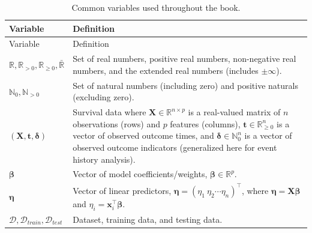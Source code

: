 \documentclass[
  letterpaper,
  krantz2]{style/krantz}
\begin{document}
\begin{longtable}[]{@{}
  >{\raggedright\arraybackslash}p{}
  >{\raggedright\arraybackslash}p{}@{}}
\caption{Common variables used throughout the
book.}\label{tbl-not-var}\tabularnewline
\toprule\noalign{}
\begin{minipage}[b]{\linewidth}\raggedright
Variable
\end{minipage} & \begin{minipage}[b]{\linewidth}\raggedright
Definition
\end{minipage} \\
\midrule\noalign{}
\endfirsthead
\toprule\noalign{}
\begin{minipage}[b]{\linewidth}\raggedright
Variable
\end{minipage} & \begin{minipage}[b]{\linewidth}\raggedright
Definition
\end{minipage} \\
\midrule\noalign{}
\endhead
\bottomrule\noalign{}
\endlastfoot
\(\mathbb{R}, \mathbb{R}_{>0}, \mathbb{R}_{\geq 0}, \bar{\mathbb{R}}\) &
Set of real numbers, positive real numbers, non-negative real numbers,
and the extended real numbers (includes \(\pm\infty\)). \\
\(\mathbb{N}_0, \mathbb{N}_{> 0}\) & Set of natural numbers (including
zero) and positive naturals (excluding zero). \\
\((\mathbf{X}, \mathbf{t}, \boldsymbol{\delta})\) & Survival data where
\(\mathbf{X}\in \mathbb{R}^{n \times p}\) is a real-valued matrix of
\(n\) observations (rows) and \(p\) features (columns),
\(\mathbf{t}\in \mathbb{R}_{\geq 0}^n\) is a vector of observed outcome
times, and \(\boldsymbol{\delta}\in \mathbb{N}_0^n\) is a vector of
observed outcome indicators (generalized here for event history
analysis). \\
\(\boldsymbol{\beta}\) & Vector of model coefficients/weights,
\(\boldsymbol{\beta}\in \mathbb{R}^p\). \\
\(\boldsymbol{\eta}\) & Vector of linear predictors,
\(\boldsymbol{\mathbf{\eta}} = ({\eta}_1 \ {\eta}_2 \cdots {\eta}_{n})^\top\),
where \(\boldsymbol{\eta}= \mathbf{X}\boldsymbol{\beta}\) and
\(\eta_i = \mathbf{x}_{i}^\top\boldsymbol{\beta}\). \\
\(\mathcal{D}, \mathcal{D}_{train}, \mathcal{D}_{test}\) & Dataset,
training data, and testing data. \\
\end{longtable}
\end{document}
